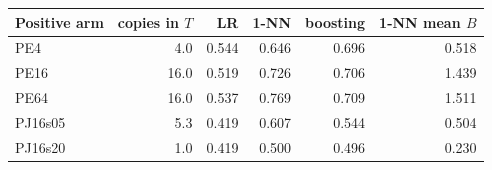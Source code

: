 \begin{tabular}{lrrrrr}\toprule
Positive arm & copies in $T$ & LR & 1-NN & boosting & 1-NN mean $B$\\\midrule
PE4 & 4.0 & 0.544 & 0.646 & 0.696 & 0.518\\
PE16 & 16.0 & 0.519 & 0.726 & 0.706 & 1.439\\
PE64 & 16.0 & 0.537 & 0.769 & 0.709 & 1.511\\
PJ16s05 & 5.3 & 0.419 & 0.607 & 0.544 & 0.504\\
PJ16s20 & 1.0 & 0.419 & 0.500 & 0.496 & 0.230\\
\bottomrule\end{tabular}
